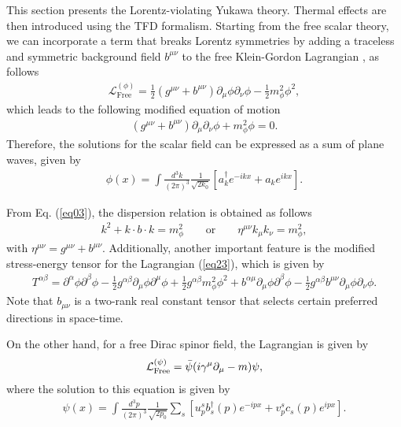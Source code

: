 \documentclass[11pt,showpacs,preprintnumbers,amsmath,amssymb,prd,nofootinbib,superscriptaddress]{revtex4-2}
\begin{document}
This section presents the Lorentz-violating Yukawa theory. Thermal effects are then introduced using the TFD formalism. Starting from the free scalar theory, we can incorporate a term that breaks Lorentz symmetries by adding a traceless and symmetric background field $b^{\mu\nu}$ to the free Klein-Gordon Lagrangian  \cite{kostelecky2,altschul}, as follows
\begin{eqnarray}
    \mathcal{L}_{\text{Free}}^{(\phi)}=\frac{1}{2}\left(g^{\mu\nu}+b^{\mu\nu}\right)\partial_\mu\phi\partial_\nu\phi-\frac{1}{2}m_{\phi}^2\phi^2,\label{eq23}
\end{eqnarray}
which leads to the following modified equation of motion
\begin{eqnarray}
    \left(g^{\mu\nu}+b^{\mu\nu}\right)\partial_\mu\partial_\nu\phi+m_\phi^2\phi=0.\label{eq03}
\end{eqnarray}
Therefore, the solutions for the scalar field can be expressed as a sum of plane waves, given by
\begin{eqnarray}
    \phi(x)=\int\frac{d^3k}{(2\pi)^3}\frac{1}{\sqrt{2k_0}}\left[a_k^{\dagger}e^{-ikx}+a_k e^{ikx}\right].\label{eq04}
    \end{eqnarray}
    
From Eq. (\ref{eq03}), the dispersion relation is obtained as follows
\begin{eqnarray}
    k^2+k\cdot b\cdot k=m_\phi^2\quad\quad \text{or}\quad\quad \eta^{\mu\nu}k_{\mu}k_{\nu}=m_{\phi}^2,
\end{eqnarray}
with $\eta^{\mu\nu}=g^{\mu\nu}+b^{\mu\nu}$. Additionally, another important feature is the modified stress-energy tensor for the Lagrangian (\ref{eq23}), which is given by
\begin{eqnarray}
    T^{\alpha\beta}=\partial^\alpha\phi\partial^\beta\phi-\frac{1}{2}g^{\alpha\beta}\partial_\mu\phi\partial^\mu\phi+\frac{1}{2}g^{\alpha\beta}m_\phi^2\phi^2 +b^{\alpha\mu}\partial_\mu\phi\partial^\beta\phi-\frac{1}{2}g^{\alpha\beta}b^{\mu\nu}\partial_\mu\phi\partial_\nu\phi.\label{eq26}
\end{eqnarray}
Note that $b_{\mu\nu}$ is a two-rank real constant tensor that selects certain preferred directions in space-time.

On the other hand, for a free Dirac spinor field, the Lagrangian is given by
\begin{eqnarray}
    \mathcal{L}_{\text{Free}}^{(\psi)}=\Bar{\psi}(i\gamma^\mu\partial_\mu-m)\psi,
\end{eqnarray}
where the solution to this equation is given by
\begin{eqnarray}
    \psi (x) = \int \frac{d^3 p}{(2 \pi)^3}\frac{1}{\sqrt{2p_0}}  \sum_{s}\left[ u^s_p b^\dagger_s(p) e^{-ipx} + v^s_p c_s(p) e^{ipx}\right].\label{eq25}
\end{eqnarray}
\end{document}
